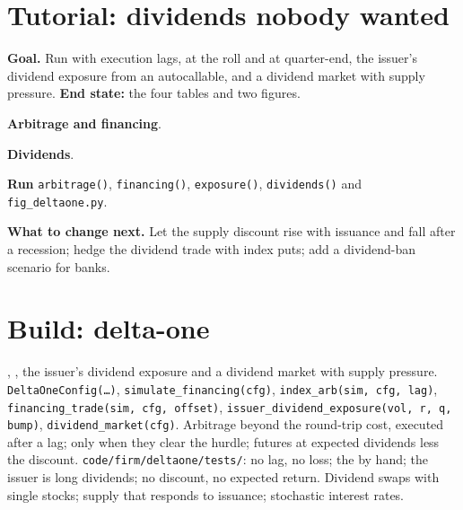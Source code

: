 \section{Tutorial: dividends nobody wanted}\label{tut:s2:delta-one-and-dividends:tut}

\begin{tutorial}
\textbf{Goal.} Run  with execution lags,  at the roll and at quarter-end, the issuer's dividend exposure from an
autocallable, and a dividend market with supply pressure. \textbf{End state:} the four tables and two figures.
\begin{tutsteps}
\item \textbf{Arbitrage and financing}.
\label{lst:s2:delta-one-and-dividends:arb}
\item \textbf{Dividends}.
\label{lst:s2:delta-one-and-dividends:div}
\item \textbf{Run} \texttt{arbitrage()}, \texttt{financing()}, \texttt{exposure()}, \texttt{dividends()} and \texttt{fig\_deltaone.py}.
\end{tutsteps}
\textbf{What to change next.} Let the supply discount rise with issuance and fall after a recession; hedge the dividend trade with index puts; add a
dividend-ban scenario for banks.
\end{tutorial}

\section{Build: delta-one}\label{bld:s2:delta-one-and-dividends:deltaone}

\begin{build}
 , , the issuer's dividend exposure and a dividend market with supply pressure.
 \texttt{DeltaOneConfig(\dots)}, \texttt{simulate\_financing(cfg)}, \texttt{index\_arb(sim, cfg, lag)},
\texttt{financing\_trade(sim, cfg, offset)}, \texttt{issuer\_dividend\_exposure(vol, r, q, bump)}, \texttt{dividend\_market(cfg)}.
 Arbitrage beyond the round-trip cost, executed after a lag;  only when they clear the hurdle; futures at expected
dividends less the discount.
 \texttt{code/firm/deltaone/tests/}: no lag, no loss; the  by hand; the issuer is long dividends; no discount,
no expected return.
 Dividend swaps with single stocks; supply that responds to issuance; stochastic interest rates.
\end{build}

